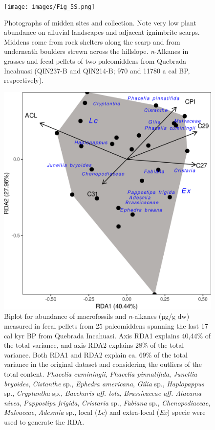 \documentclass[
  authoryear,
  preprint,
  3p]{elsarticle}
\begin{document}
\begin{figure}

{\centering \texttt{[image: images/Fig\_5S.png]}

}

\caption{Photographs of midden sites and collection. Note very low plant
abundance on alluvial landscapes and adjacent ignimbrite scarps. Middens
come from rock shelters along the scarp and from underneath boulders
strewn across the hillslope. \emph{n}-Alkanes in grasses and fecal
pellets of two paleomiddens from Quebrada Incahuasi (QIN237-B and
QIN214-B; 970 and 11780 a cal BP, respectively).}

\end{figure}

\begin{figure}

{\centering \includegraphics{images/Fig_6S.png}

}

\caption{Biplot for abundance of macrofossils and \emph{n}-alkanes (µg/g
dw) measured in fecal pellets from 25 paleomiddens spanning the last 17
cal kyr BP from Quebrada Incahuasi. Axis RDA1 explains 40,44\% of the
total variance, and axis RDA2 explains 28\% of the total variance. Both
RDA1 and RDA2 explain ca. 69\% of the total variance in the original
dataset and considering the outliers of the total content.
\emph{Phacelia cuminingii}, \emph{Phacelia pinnatifida}, \emph{Junellia
bryoides}, \emph{Cistanthe} sp., \emph{Ephedra americana}, \emph{Gilia}
sp., \emph{Haplopappus} sp., \emph{Cryptantha} sp., \emph{Baccharis aff.
tola}, \emph{Brassicaceae aff. Atacama nivea}, \emph{Pappostipa
frigida}, \emph{Cristaria} sp., \emph{Fabiana} sp.,
\emph{Chenopodiaceae}, \emph{Malvaceae}, \emph{Adesmia} sp., local
(\emph{Lc}) and extra-local (\emph{Ex}) specie were used to generate the
RDA.}

\end{figure}
\end{document}
